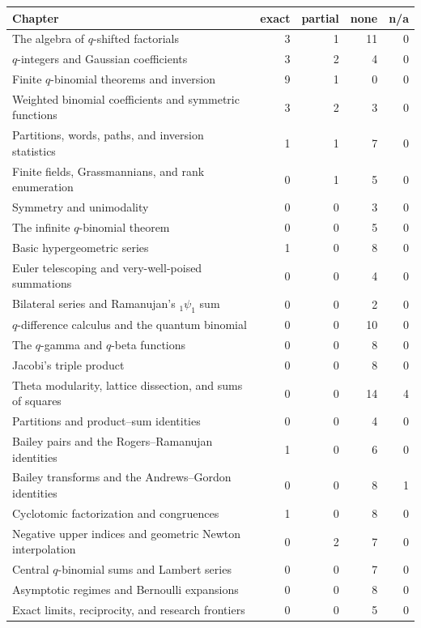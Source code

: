 \documentclass[11pt,a4paper,oneside,openany]{book}
\theoremstyle{definition}
\theoremstyle{remark}
\newcommand{\statusexact}{\textsf{\color{statusgreen}exact}}
\newcommand{\statuspartial}{\textsf{\color{statusamber}partial}}
\newcommand{\statusnone}{\textsf{\color{statusred}none}}
\newcommand{\statusna}{\textsf{n/a}}
\begin{document}
\begin{center}
\begin{tabular}{@{}p{}rrrr@{}}
\toprule
Chapter & \statusexact & \statuspartial & \statusnone & \statusna\\
\midrule
The algebra of $q$-shifted factorials & 3 & 1 & 11 & 0\\
$q$-integers and Gaussian coefficients & 3 & 2 & 4 & 0\\
Finite $q$-binomial theorems and inversion & 9 & 1 & 0 & 0\\
Weighted binomial coefficients and symmetric functions & 3 & 2 & 3 & 0\\
Partitions, words, paths, and inversion statistics & 1 & 1 & 7 & 0\\
Finite fields, Grassmannians, and rank enumeration & 0 & 1 & 5 & 0\\
Symmetry and unimodality & 0 & 0 & 3 & 0\\
The infinite $q$-binomial theorem & 0 & 0 & 5 & 0\\
Basic hypergeometric series & 1 & 0 & 8 & 0\\
Euler telescoping and very-well-poised summations & 0 & 0 & 4 & 0\\
Bilateral series and Ramanujan's \texorpdfstring{${}_1\psi_1$}{1psi1} sum & 0 & 0 & 2 & 0\\
$q$-difference calculus and the quantum binomial & 0 & 0 & 10 & 0\\
The $q$-gamma and $q$-beta functions & 0 & 0 & 8 & 0\\
Jacobi's triple product & 0 & 0 & 8 & 0\\
Theta modularity, lattice dissection, and sums of squares & 0 & 0 & 14 & 4\\
Partitions and product--sum identities & 0 & 0 & 4 & 0\\
Bailey pairs and the Rogers--Ramanujan identities & 1 & 0 & 6 & 0\\
Bailey transforms and the Andrews--Gordon identities & 0 & 0 & 8 & 1\\
Cyclotomic factorization and congruences & 1 & 0 & 8 & 0\\
Negative upper indices and geometric Newton interpolation & 0 & 2 & 7 & 0\\
Central $q$-binomial sums and Lambert series & 0 & 0 & 7 & 0\\
Asymptotic regimes and Bernoulli expansions & 0 & 0 & 8 & 0\\
Exact limits, reciprocity, and research frontiers & 0 & 0 & 5 & 0\\

\end{tabular}
\end{center}
\end{document}
